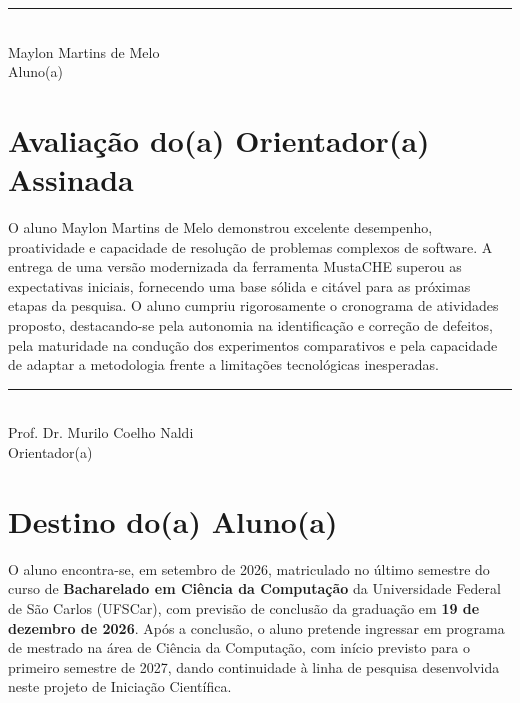 \documentclass[12pt,a4paper,oneside]{article}
\begin{document}
\vspace{1cm}

\begin{center}
  \rule{10cm}{0.4pt}\\
  Maylon Martins de Melo\\
  Aluno(a)
\end{center}

\section{Avaliação do(a) Orientador(a) Assinada}

O aluno Maylon Martins de Melo demonstrou excelente desempenho, proatividade e capacidade de
resolução de problemas complexos de software. A entrega de uma versão modernizada da ferramenta
MustaCHE superou as expectativas iniciais, fornecendo uma base sólida e citável para as
próximas etapas da pesquisa. O aluno cumpriu rigorosamente o cronograma de atividades proposto,
destacando-se pela autonomia na identificação e correção de defeitos, pela maturidade na
condução dos experimentos comparativos e pela capacidade de adaptar a metodologia frente a
limitações tecnológicas inesperadas.

\vspace{2cm}

\begin{center}
  \rule{10cm}{0.4pt}\\
  Prof. Dr. Murilo Coelho Naldi\\
  Orientador(a)
\end{center}

\section{Destino do(a) Aluno(a)}

O aluno encontra-se, em setembro de 2026, matriculado no último semestre do curso de
\textbf{Bacharelado em Ciência da Computação} da Universidade Federal de São Carlos (UFSCar),
com previsão de conclusão da graduação em \textbf{19 de dezembro de 2026}. Após a conclusão,
o aluno pretende ingressar em programa de mestrado na área de Ciência da Computação, com
início previsto para o primeiro semestre de 2027, dando continuidade à linha de pesquisa
desenvolvida neste projeto de Iniciação Científica.
\end{document}
